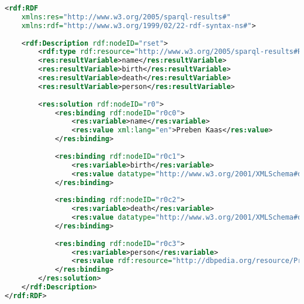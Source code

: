 \begin{lstlisting}[language=xml, caption={RDF from SPARQL query}, label=lst:prebenrdf]
<rdf:RDF
    xmlns:res="http://www.w3.org/2005/sparql-results#"
    xmlns:rdf="http://www.w3.org/1999/02/22-rdf-syntax-ns#">
    
    <rdf:Description rdf:nodeID="rset">
        <rdf:type rdf:resource="http://www.w3.org/2005/sparql-results#ResultSet" />
        <res:resultVariable>name</res:resultVariable>
        <res:resultVariable>birth</res:resultVariable>
        <res:resultVariable>death</res:resultVariable>
        <res:resultVariable>person</res:resultVariable>
        
        <res:solution rdf:nodeID="r0">
            <res:binding rdf:nodeID="r0c0">
                <res:variable>name</res:variable>
                <res:value xml:lang="en">Preben Kaas</res:value>
            </res:binding>
            
            <res:binding rdf:nodeID="r0c1">
                <res:variable>birth</res:variable>
                <res:value datatype="http://www.w3.org/2001/XMLSchema#date">1930-03-30</res:value>
            </res:binding>
            
            <res:binding rdf:nodeID="r0c2">
                <res:variable>death</res:variable>
                <res:value datatype="http://www.w3.org/2001/XMLSchema#date">1981-03-27</res:value>
            </res:binding>
            
            <res:binding rdf:nodeID="r0c3">
                <res:variable>person</res:variable>
                <res:value rdf:resource="http://dbpedia.org/resource/Preben_Kaas"/>
            </res:binding>
        </res:solution>
    </rdf:Description>
</rdf:RDF>
\end{lstlisting}

